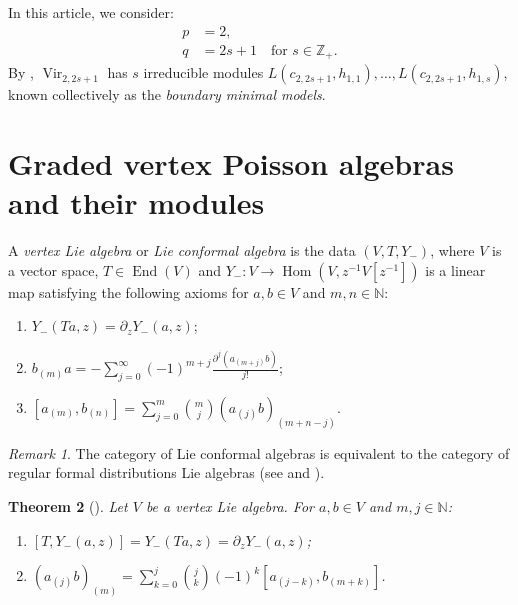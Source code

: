 \documentclass[a4paper, 12pt, reqno]{amsart}
\newtheorem{theorem}{Theorem}[section]
\theoremstyle{remark}
\newtheorem{remark}[theorem]{Remark}
\DeclareMathOperator{\Vir}{Vir}
\DeclareMathOperator{\Hom}{Hom}
\DeclareMathOperator{\End}{End}
\begin{document}
In this article, we consider:
\begin{align*}
  p &= 2, \\
  q &= 2s + 1 \quad \text{for $s \in \mathbb{Z}_+$}.
\end{align*}
By , $\Vir_{2, 2s + 1}$ has $s$ irreducible modules $L(c_{2, 2s + 1}, h_{1, 1}), \dots, L(c_{2, 2s + 1}, h_{1, s})$, known collectively as the \emph{boundary minimal models}.

\section{Graded vertex Poisson algebras and their modules}
\label{sec:graded-vert-poiss}

A \emph{vertex Lie algebra} or \emph{Lie conformal algebra} is the data $(V, T, Y_-)$, where $V$ is a vector space, $T \in \End(V)$ and $Y_-: V \to \Hom(V, z^{-1}V[z^{-1}])$ is a linear map satisfying the following axioms for $a, b \in V$ and $m, n \in \mathbb{N}$:
\begin{enumerate}
\item $Y_-(Ta, z) = \partial_zY_-(a, z)$;
\item $b_{(m)}a = -\sum_{j = 0}^{\infty}(-1)^{m + j}\frac{\partial^j(a_{(m + j)}b)}{j!}$;
\item $[a_{(m)}, b_{(n)}] = \sum_{j = 0}^m\binom{m}{j}(a_{(j)}b)_{(m + n - j)}$.
\end{enumerate}
\begin{remark}
  \label{rmk:4}
  The category of Lie conformal algebras is equivalent to the category of regular formal distributions Lie algebras (see \cite[\S2.7]{kac_vertex_1998} and \cite[\S2]{nozaradan_introduction_2008}).
\end{remark}

\begin{theorem}[{\cite{li_vertex_2004}}]
  \label{thr:11}
  Let $V$ be a vertex Lie algebra.
  For $a, b \in V$ and $m, j \in \mathbb{N}$:
  \begin{enumerate}
  \item $[T, Y_-(a, z)] = Y_-(Ta, z) = \partial_zY_-(a, z)$;
  \item $(a_{(j)}b)_{(m)} = \sum_{k = 0}^j\binom{j}{k}(-1)^k[a_{(j - k)}, b_{(m + k)}]$.
  \end{enumerate}
\end{theorem}
\end{document}
